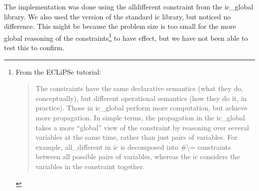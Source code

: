 The implementation was done using the alldifferent constraint from the ic\_global library. We also used the version of the standard ic library, but noticed no difference. This might be because the problem size is too small for the more global reasoning of the constraints\footnote{From the ECLiPSe tutorial: \begin{quote}
   The constraints have the same declarative semantics (what they do, conceptually), but different operational semantics (how they do it, in practice). Those in ic\_global perform more computation, but achieve more propagation. In simple terms, the propagation in the ic\_global takes a more ``global'' view of the constraint by reasoning over several variables at the same time, rather than just pairs of variables. For example, all\_different in ic is decomposed into \#\textbackslash= constraints between all possible pairs of variables, whereas the ic considers the variables in the constraint together.                                                                                                                                                                                                                                                                                                                                                                                                                                                                                                                                                                                                                                                                                                                                                                                                                                                                                                                                                                                                                                                                                                                                                                                                                                              \end{quote}
} to have effect, but we have not been able to test this to confirm.


